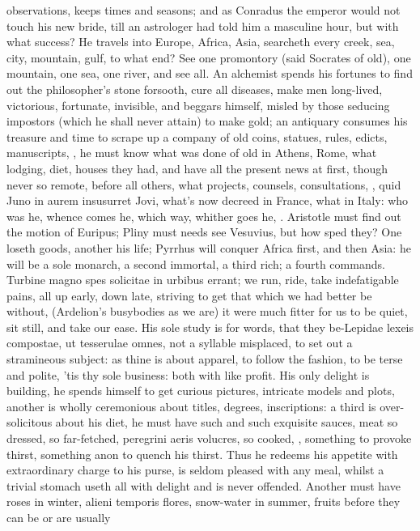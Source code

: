 {observations, keeps times and seasons; and as Conradus the
emperor would not touch his new bride, till an astrologer had told him
a masculine hour, but with what success? He travels into Europe,
Africa, Asia, searcheth every creek, sea, city, mountain, gulf, to what
end? See one promontory (said Socrates of old), one mountain, one sea,
one river, and see all. An alchemist spends his fortunes to find out
the philosopher's stone forsooth, cure all diseases, make men
long-lived, victorious, fortunate, invisible, and beggars himself,
misled by those seducing impostors (which he shall never attain) to
make gold; an antiquary consumes his treasure and time to scrape up a
company of old coins, statues, rules, edicts, manuscripts, \etc{}, he must
know what was done of old in Athens, Rome, what lodging, diet, houses
they had, and have all the present news at first, though never so
remote, before all others, what projects, counsels, consultations, \etc{},
quid Juno in aurem insusurret Jovi, what's now decreed in France, what
in Italy: who was he, whence comes he, which way, whither goes he, \etc{}.
Aristotle must find out the motion of Euripus; Pliny must needs see
Vesuvius, but how sped they? One loseth goods, another his life;
Pyrrhus will conquer Africa first, and then Asia: he will be a sole
monarch, a second immortal, a third rich; a fourth commands. 
Turbine magno spes solicitae in urbibus errant; we run, ride, take
indefatigable pains, all up early, down late, striving to get that
which we had better be without, (Ardelion's busybodies as we are) it
were much fitter for us to be quiet, sit still, and take our ease. His
sole study is for words, that they be-Lepidae lexeis compostae, ut
tesserulae omnes, not a syllable misplaced, to set out a stramineous
subject: as thine is about apparel, to follow the fashion, to be terse
and polite, 'tis thy sole business: both with like profit. His only
delight is building, he spends himself to get curious pictures,
intricate models and plots, another is wholly ceremonious about titles,
degrees, inscriptions: a third is over-solicitous about his diet, he
must have such and such exquisite sauces, meat so dressed, so
far-fetched, peregrini aeris volucres, so cooked, \etc{}, something to
provoke thirst, something anon to quench his thirst. Thus he redeems
his appetite with extraordinary charge to his purse, is seldom pleased
with any meal, whilst a trivial stomach useth all with delight and is
never offended. Another must have roses in winter, alieni temporis
flores, snow-water in summer, fruits before they can be or are usually
}
